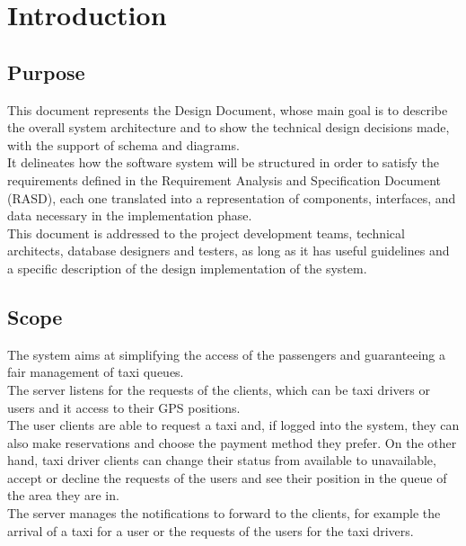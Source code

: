 	
%


\newpage
\section{Introduction}		
	\subsection{Purpose}
		This document represents the Design Document, whose main goal is to describe the overall system architecture and to show the technical design decisions made, with the support of schema and diagrams.\\ It delineates how the software system will be structured in order to satisfy the requirements defined in the Requirement Analysis and Specification Document (RASD), each one translated into a representation of components, interfaces, and data necessary in the implementation phase.
		\\This document is addressed to the project development teams, technical architects, database designers and testers, as long as it has useful guidelines and a specific description of the design implementation of the system.
		
	\subsection{Scope}
		The system aims at simplifying the access of the passengers and guaranteeing a fair management of taxi queues.\\
		The server listens for the requests of the clients, which can be taxi drivers or users and it access to their GPS positions.\\
		The user clients are able to request a taxi and, if logged into the system, they can also make reservations and choose the payment method they prefer. On the other hand, taxi driver clients can change their status from available to unavailable, accept or decline the requests of the users and see their position in the queue of the area they are in.\\The server manages the notifications to forward to the clients, for example the arrival of a taxi for a user or the requests of the users for the taxi drivers. 
\newpage
